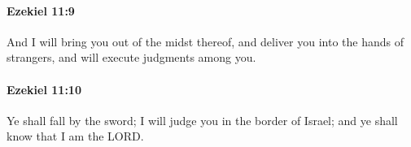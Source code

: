 		\paragraph{Ezekiel 11:9} %
			\label{EZEKIEL-11-9}

			And I will bring you out of the midst thereof, and deliver you into the hands of strangers, and will execute judgments among you.


		\paragraph{Ezekiel 11:10} %
			\label{EZEKIEL-11-10}

			Ye shall fall by the sword; I will judge you in the border of Israel; and ye shall know that I am the LORD.


